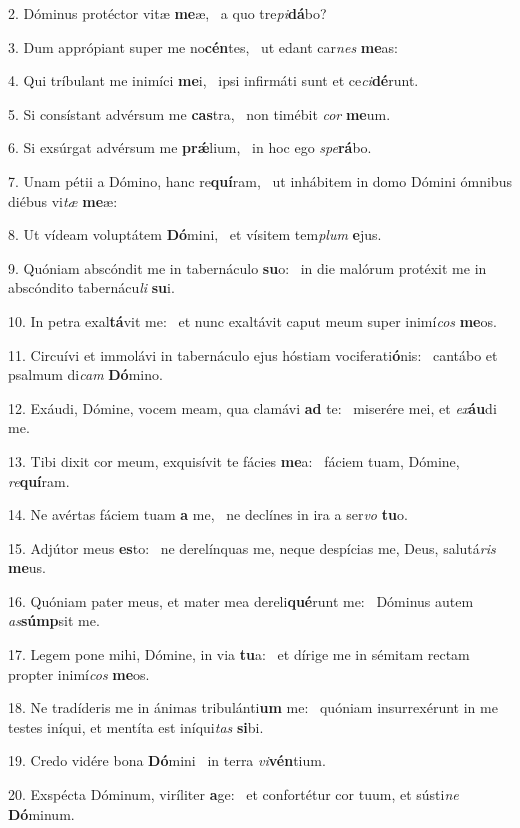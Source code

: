 2. Dóminus protéctor vitæ \textbf{me}æ, \ast\  a quo tre\textit{pi}\textbf{dá}bo?\

3. Dum apprópiant super me no\textbf{cén}tes, \ast\  ut edant car\textit{nes} \textbf{me}as:\

4. Qui tríbulant me inimíci \textbf{me}i, \ast\  ipsi infirmáti sunt et ce\textit{ci}\textbf{dé}runt.\

5. Si consístant advérsum me \textbf{cas}tra, \ast\  non timébit \textit{cor} \textbf{me}um.\

6. Si exsúrgat advérsum me \textbf{prǽ}lium, \ast\  in hoc ego \textit{spe}\textbf{rá}bo.\

7. Unam pétii a Dómino, hanc re\textbf{quí}ram, \ast\  ut inhábitem in domo Dómini ómnibus diébus vi\textit{tæ} \textbf{me}æ:\

8. Ut vídeam voluptátem \textbf{Dó}mini, \ast\  et vísitem tem\textit{plum} \textbf{e}jus.\

9. Quóniam abscóndit me in tabernáculo \textbf{su}o: \ast\  in die malórum protéxit me in abscóndito tabernácu\textit{li} \textbf{su}i.\

10. In petra exal\textbf{tá}vit me: \ast\  et nunc exaltávit caput meum super inimí\textit{cos} \textbf{me}os.\

11. Circuívi et immolávi in tabernáculo ejus hóstiam vociferati\textbf{ó}nis: \ast\  cantábo et psalmum di\textit{cam} \textbf{Dó}mino.\

12. Exáudi, Dómine, vocem meam, qua clamávi \textbf{ad} te: \ast\  miserére mei, et \textit{ex}\textbf{áu}di me.\

13. Tibi dixit cor meum, exquisívit te fácies \textbf{me}a: \ast\  fáciem tuam, Dómine, \textit{re}\textbf{quí}ram.\

14. Ne avértas fáciem tuam \textbf{a} me, \ast\  ne declínes in ira a ser\textit{vo} \textbf{tu}o.\

15. Adjútor meus \textbf{es}to: \ast\  ne derelínquas me, neque despícias me, Deus, salutá\textit{ris} \textbf{me}us.\

16. Quóniam pater meus, et mater mea dereli\textbf{qué}runt me: \ast\  Dóminus autem \textit{as}\textbf{súmp}sit me.\

17. Legem pone mihi, Dómine, in via \textbf{tu}a: \ast\  et dírige me in sémitam rectam propter inimí\textit{cos} \textbf{me}os.\

18. Ne tradíderis me in ánimas tribulánti\textbf{um} me: \ast\  quóniam insurrexérunt in me testes iníqui, et mentíta est iníqui\textit{tas} \textbf{si}bi.\

19. Credo vidére bona \textbf{Dó}mini \ast\  in terra \textit{vi}\textbf{vén}tium.\

20. Exspécta Dóminum, viríliter \textbf{a}ge: \ast\  et confortétur cor tuum, et sústi\textit{ne} \textbf{Dó}minum.\

